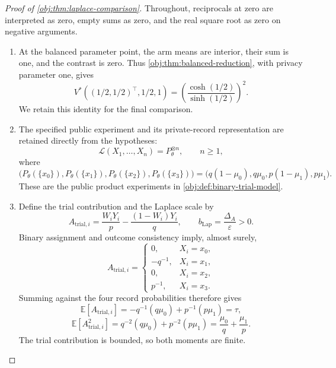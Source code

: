 \begin{proof}[Proof of \cref{obj:thm:laplace-comparison}]
Throughout, reciprocals at zero are interpreted as zero, empty sums as zero, and the real square root as zero on negative arguments.

\begin{enumerate}
\item At the balanced parameter point, the arm means are interior, their sum is one, and the contrast is zero. Thus \cref{obj:thm:balanced-reduction}, with privacy parameter one, gives
\[
V^*((1/2,1/2)^\top,1/2,1)
=
\left(\frac{\cosh(1/2)}{\sinh(1/2)}\right)^2.
\]
We retain this identity for the final comparison.

\item The specified public experiment and its private-record representation are retained directly from the hypotheses:
\[
\mathcal L(X_1,\ldots,X_n)=P_\theta^{\otimes n},
\qquad n\ge1,
\]
where
\[
\bigl(P_\theta(\{x_0\}),P_\theta(\{x_1\}),
P_\theta(\{x_2\}),P_\theta(\{x_3\})\bigr)
=
\bigl(q(1-\mu_0),q\mu_0,p(1-\mu_1),p\mu_1\bigr).
\]
These are the public product experiments in \cref{obj:def:binary-trial-model}.

\item Define the trial contribution and the Laplace scale by
\[
A_{\mathrm{trial},i}
=
\frac{W_iY_i}{p}-\frac{(1-W_i)Y_i}{q},
\qquad
b_{\mathrm{Lap}}=\frac{\Delta_A}{\varepsilon}>0.
\]
Binary assignment and outcome consistency imply, almost surely,
\[
A_{\mathrm{trial},i}
=
\begin{cases}
0,&X_i=x_0,\\
-q^{-1},&X_i=x_1,\\
0,&X_i=x_2,\\
p^{-1},&X_i=x_3.
\end{cases}
\]
Summing against the four record probabilities therefore gives
\[
\mathbb E[A_{\mathrm{trial},i}]
=
-q^{-1}(q\mu_0)+p^{-1}(p\mu_1)=\tau,
\]
\[
\mathbb E[A_{\mathrm{trial},i}^2]
=
q^{-2}(q\mu_0)+p^{-2}(p\mu_1)
=
\frac{\mu_0}{q}+\frac{\mu_1}{p}.
\]
The trial contribution is bounded, so both moments are finite.


\end{enumerate}
\end{proof}
